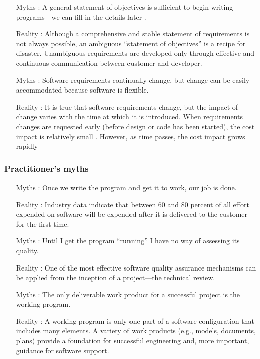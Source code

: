 \documentclass[12pt]{article}
\begin{document}
\begin{itemize}
	\item [Myths :] A general statement of objectives is sufficient to begin writing
programs—we can fill in the details later .
	\item [Reality :] Although a comprehensive and stable statement of requirements is
not always possible, an ambiguous “statement of objectives” is a recipe for disaster. Unambiguous requirements are developed only through effective and continuous
communication between customer and developer.
\end{itemize}


\begin{itemize}
	\item [Myths :] Software requirements continually change, but change can be easily
accommodated because software is flexible.
	\item [Reality :] It is true that software requirements change, but the impact of
change varies with the time at which it is introduced. When requirements changes are requested early (before design or code has been
started), the cost impact is relatively small .
However, as time
passes, the cost impact grows rapidly
\end{itemize}


\newpage

\subsubsection{Practitioner’s myths}

\begin{itemize}
	\item [Myths :] Once we write the program and get it to work, our job is done.
	\item [Reality :]  Industry data indicate that between 60 and 80 percent of all effort expended on software will be expended after it is delivered to the customer for the first time.
\end{itemize}

\begin{itemize}
	\item [Myths :] Until I get the program “running” I have no way of assessing its quality.
	\item [Reality :] One of the most effective software quality assurance mechanisms
can be applied from the inception of a project—the technical review.
\end{itemize}

\begin{itemize}
	\item [Myths :] The only deliverable work product for a successful project is the working
program.
	\item [Reality :] A working program is only one part of a software configuration that
includes many elements. A variety of work products (e.g., models,
documents, plans) provide a foundation for successful engineering
and, more important, guidance for software support.
\end{itemize}
\end{document}
